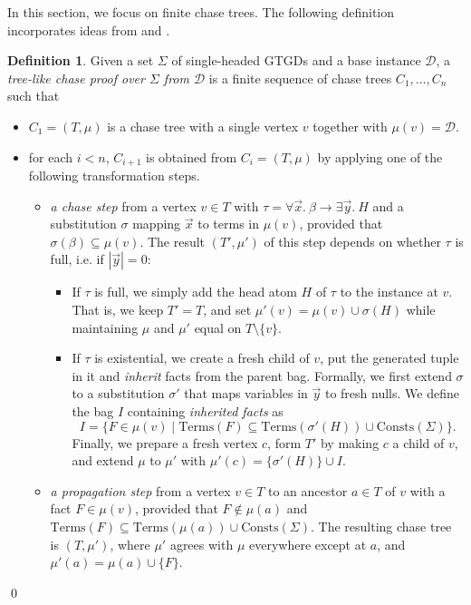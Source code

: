 \documentclass[12pt]{report}
\theoremstyle{plain}
\theoremstyle{definition}
\newtheorem{definition}[theorem]{Definition}
\def\Consts{{\mathrm{Consts}}}
\def\Terms{{\mathrm{Terms}}}
\begin{document}
In this section, we focus on finite chase trees. The following definition incorporates ideas from \cite{benedikt_buron_germano_kappelmann_motik_2022} and \cite{kappelmann_2019}.

\begin{definition}
\label{definition:tree-like-chase-proof}
  Given a set $\Sigma$ of single-headed GTGDs and a base instance $\mathcal{D}$, a \emph{tree-like chase proof over $\Sigma$ from $\mathcal{D}$} is a finite sequence of chase trees $C_1, \ldots, C_n$ such that
  \begin{itemize}
    \item $C_1 = (T, \mu)$ is a chase tree with a single vertex $v$ together with $\mu(v) = \mathcal{D}$.
    \item for each $i < n$, $C_{i + 1}$ is obtained from $C_i = (T, \mu)$ by applying one of the following transformation steps.
    \begin{itemize}
      \item \emph{a chase step} from a vertex $v \in T$ with $\tau = \forall \vec{x}.\ \beta \rightarrow \exists \vec{y}.\ H$ and a substitution $\sigma$ mapping $\vec{x}$ to terms in $\mu(v)$, provided that $\sigma(\beta) \subseteq \mu(v)$. The result $(T', \mu')$ of this step depends on whether $\tau$ is full, i.e. if $|\vec{y}| = 0$:
      \begin{itemize}
        \item If $\tau$ is full, we simply add the head atom $H$ of $\tau$ to the instance at $v$. That is, we keep $T' = T$, and set $\mu'(v) = \mu(v) \cup \sigma(H)$ while maintaining $\mu$ and $\mu'$ equal on $T \setminus \{v\}$.
        \item If $\tau$ is existential, we create a fresh child of $v$, put the generated tuple in it and \emph{inherit} facts from the parent bag. Formally, we first extend $\sigma$ to a substitution $\sigma'$ that maps variables in $\vec{y}$ to fresh nulls. We define the bag $I$ containing \emph{inherited facts} as $$I = \{ F \in \mu(v) \mid \Terms(F) \subseteq \Terms(\sigma'(H)) \cup \Consts(\Sigma) \}.$$ Finally, we prepare a fresh vertex $c$, form $T'$ by making $c$ a child of $v$, and extend $\mu$ to $\mu'$ with $\mu'(c) = \{\sigma'(H)\} \cup I$.
      \end{itemize}
      \item \emph{a propagation step} from a vertex $v \in T$ to an ancestor $a \in T$ of $v$ with a fact $F \in \mu(v)$, provided that $F \not\in \mu(a)$ and $\Terms(F) \subseteq \Terms(\mu(a)) \cup \Consts(\Sigma)$. The resulting chase tree is $(T, \mu')$, where $\mu'$ agrees with $\mu$ everywhere except at $a$, and $\mu'(a) = \mu(a) \cup \{F\}$.
    \end{itemize}
  \end{itemize}
  \qed
\end{definition}
\end{document}
